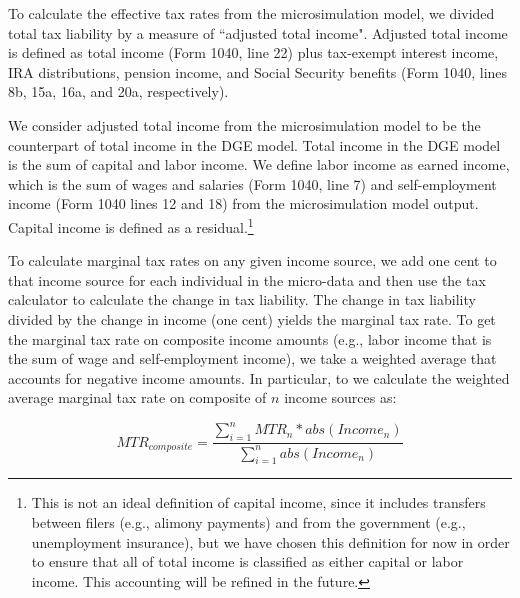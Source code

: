 \documentclass[letterpaper,12pt]{article}
\theoremstyle{definition}
\begin{document}
\begin{spacing}{1.5}
    To calculate the effective tax rates from the microsimulation model, we divided total tax liability by a measure of ``adjusted total income".  Adjusted total income is defined as total income (Form 1040, line 22) plus tax-exempt interest income, IRA distributions, pension income, and Social Security benefits (Form 1040, lines 8b, 15a, 16a, and 20a, respectively).

    We consider adjusted total income from the microsimulation model to be the counterpart of total income in the DGE model. Total income in the DGE model is the sum of capital and labor income. We define labor income as earned income, which is the sum of wages and salaries (Form 1040, line 7) and self-employment income (Form 1040 lines 12 and 18) from the microsimulation model output. Capital income is defined as a residual.\footnote{This is not an ideal definition of capital income, since it includes transfers between filers (e.g., alimony payments) and from the government (e.g., unemployment insurance), but we have chosen this definition for now in order to ensure that all of total income is classified as either capital or labor income. This accounting will be refined in the future.}

    To calculate marginal tax rates on any given income source, we add one cent to that income source for each individual in the micro-data and then use the tax calculator to calculate the change in tax liability.  The change in tax liability divided by the change in income (one cent) yields the marginal tax rate.  To get the marginal tax rate on composite income amounts (e.g., labor income that is the sum of wage and self-employment income), we take a weighted average that accounts for negative income amounts.  In particular, to we calculate the weighted average marginal tax rate on composite of $n$ income sources as:

    \begin{equation}
    MTR_{composite} = \frac{\sum_{i=1}^{n} MTR_{n}*abs(Income_n)}{\sum_{i=1}^{n} abs(Income_n)}
    \end{equation}


\end{spacing}
\end{document}
